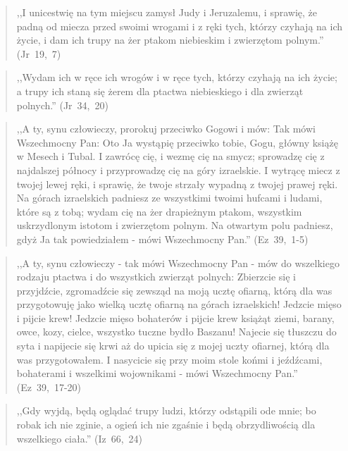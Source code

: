 \documentclass[10pt,a4paper,oneside]{article}
\begin{document}
\begin{quote}
,,I unicestwię na tym miejscu zamysł Judy i Jeruzalemu, i sprawię, że padną od miecza przed swoimi wrogami i z ręki tych, którzy czyhają na ich życie, i dam ich trupy na żer ptakom niebieskim i zwierzętom polnym.'' (Jr~19,~7)
\end{quote}
\begin{quote}
,,Wydam ich w ręce ich wrogów i w ręce tych, którzy czyhają na ich życie; a trupy ich staną się żerem dla ptactwa niebieskiego i dla zwierząt polnych.'' (Jr~34,~20)
\end{quote}
\begin{quote}
,,A ty, synu człowieczy, prorokuj przeciwko Gogowi i mów: Tak mówi Wszechmocny Pan: Oto Ja wystąpię przeciwko tobie, Gogu, główny książę w Mesech i Tubal. I zawrócę cię, i wezmę cię na smycz; sprowadzę cię z najdalszej północy i przyprowadzę cię na góry izraelskie. I wytrącę miecz z twojej lewej ręki, i sprawię, że twoje strzały wypadną z twojej prawej ręki. Na górach izraelskich padniesz ze wszystkimi twoimi hufcami i ludami, które są z tobą; wydam cię na żer drapieżnym ptakom, wszystkim uskrzydlonym istotom i zwierzętom polnym. Na otwartym polu padniesz, gdyż Ja tak powiedziałem - mówi Wszechmocny Pan.'' (Ez~39,~1-5)
\end{quote}
\begin{quote}
,,A ty, synu człowieczy - tak mówi Wszechmocny Pan - mów do wszelkiego rodzaju ptactwa i do wszystkich zwierząt polnych: Zbierzcie się i przyjdźcie, zgromadźcie się zewsząd na moją ucztę ofiarną, którą dla was przygotowuję jako wielką ucztę ofiarną na górach izraelskich! Jedzcie mięso i pijcie krew! Jedzcie mięso bohaterów i pijcie krew książąt ziemi, barany, owce, kozy, cielce, wszystko tuczne bydło Baszanu! Najecie się tłuszczu do syta i napijecie się krwi aż do upicia się z mojej uczty ofiarnej, którą dla was przygotowałem. I nasycicie się przy moim stole końmi i jeźdźcami, bohaterami i wszelkimi wojownikami - mówi Wszechmocny Pan.'' (Ez~39,~17-20)
\end{quote}
\begin{quote}
,,Gdy wyjdą, będą oglądać trupy ludzi, którzy odstąpili ode mnie; bo robak ich nie zginie, a ogień ich nie zgaśnie i będą obrzydliwością dla wszelkiego ciała.'' (Iz~66,~24)
\end{quote}
\end{document}
